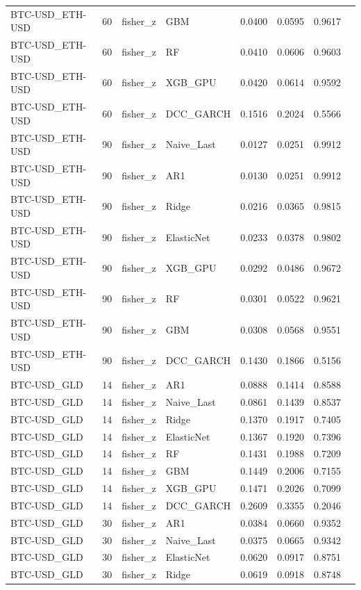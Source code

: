 \begin{table}[H]
\begin{tabular}{llllrrrr}
BTC-USD_ETH-USD & 60 & fisher_z & GBM & 0.0400 & 0.0595 & 0.9617 &  \\
BTC-USD_ETH-USD & 60 & fisher_z & RF & 0.0410 & 0.0606 & 0.9603 &  \\
BTC-USD_ETH-USD & 60 & fisher_z & XGB_GPU & 0.0420 & 0.0614 & 0.9592 &  \\
BTC-USD_ETH-USD & 60 & fisher_z & DCC_GARCH & 0.1516 & 0.2024 & 0.5566 &  \\
BTC-USD_ETH-USD & 90 & fisher_z & Naive_Last & 0.0127 & 0.0251 & 0.9912 &  \\
BTC-USD_ETH-USD & 90 & fisher_z & AR1 & 0.0130 & 0.0251 & 0.9912 &  \\
BTC-USD_ETH-USD & 90 & fisher_z & Ridge & 0.0216 & 0.0365 & 0.9815 &  \\
BTC-USD_ETH-USD & 90 & fisher_z & ElasticNet & 0.0233 & 0.0378 & 0.9802 &  \\
BTC-USD_ETH-USD & 90 & fisher_z & XGB_GPU & 0.0292 & 0.0486 & 0.9672 &  \\
BTC-USD_ETH-USD & 90 & fisher_z & RF & 0.0301 & 0.0522 & 0.9621 &  \\
BTC-USD_ETH-USD & 90 & fisher_z & GBM & 0.0308 & 0.0568 & 0.9551 &  \\
BTC-USD_ETH-USD & 90 & fisher_z & DCC_GARCH & 0.1430 & 0.1866 & 0.5156 &  \\
BTC-USD_GLD & 14 & fisher_z & AR1 & 0.0888 & 0.1414 & 0.8588 &  \\
BTC-USD_GLD & 14 & fisher_z & Naive_Last & 0.0861 & 0.1439 & 0.8537 &  \\
BTC-USD_GLD & 14 & fisher_z & Ridge & 0.1370 & 0.1917 & 0.7405 &  \\
BTC-USD_GLD & 14 & fisher_z & ElasticNet & 0.1367 & 0.1920 & 0.7396 &  \\
BTC-USD_GLD & 14 & fisher_z & RF & 0.1431 & 0.1988 & 0.7209 &  \\
BTC-USD_GLD & 14 & fisher_z & GBM & 0.1449 & 0.2006 & 0.7155 &  \\
BTC-USD_GLD & 14 & fisher_z & XGB_GPU & 0.1471 & 0.2026 & 0.7099 &  \\
BTC-USD_GLD & 14 & fisher_z & DCC_GARCH & 0.2609 & 0.3355 & 0.2046 &  \\
BTC-USD_GLD & 30 & fisher_z & AR1 & 0.0384 & 0.0660 & 0.9352 &  \\
BTC-USD_GLD & 30 & fisher_z & Naive_Last & 0.0375 & 0.0665 & 0.9342 &  \\
BTC-USD_GLD & 30 & fisher_z & ElasticNet & 0.0620 & 0.0917 & 0.8751 &  \\
BTC-USD_GLD & 30 & fisher_z & Ridge & 0.0619 & 0.0918 & 0.8748 &  \\

\end{tabular}
\end{table}
